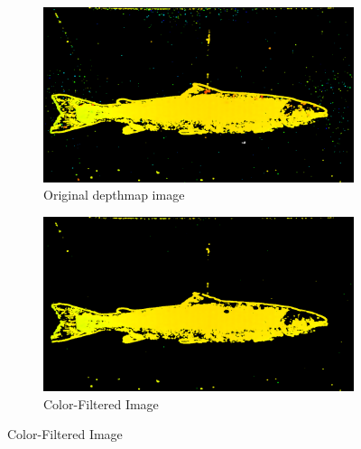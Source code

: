 \begin{figure}[H]
    \begin{subfigure}{0.49\textwidth}
        \includegraphics[width=\linewidth]{images/implementation/1_original}
        \caption{Original depthmap image} 
        \label{fig:original_depthmap}
    \end{subfigure}\hspace*{\fill}
    \begin{subfigure}{0.49\textwidth}
        \includegraphics[width=\linewidth]{images/implementation/2_color_filtering}
        \caption{Color-Filtered Image} 
        \label{fig:color_filtering}
    \end{subfigure}
    

\end{figure}
